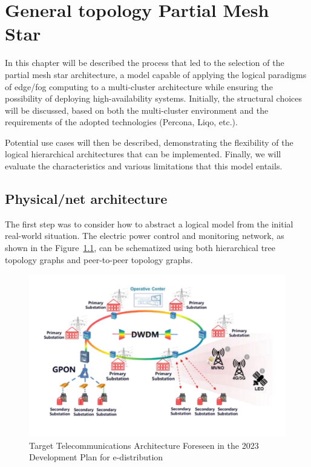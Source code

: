 \chapter{General topology Partial Mesh Star}\label{chap:partial-mesh-star}
In this chapter will be described the process that led to the selection of the partial mesh star architecture, a model capable of applying the logical paradigms of edge/fog computing to a multi-cluster architecture while ensuring the possibility of deploying high-availability systems. Initially, the structural choices will be discussed, based on both the multi-cluster environment and the requirements of the adopted technologies (Percona, Liqo, etc.).

Potential use cases will then be described, demonstrating the flexibility of the logical hierarchical architectures that can be implemented. Finally, we will evaluate the characteristics and various limitations that this model entails.

\section{Physical/net architecture}
The first step was to consider how to abstract a logical model from the initial real-world situation. The electric power control and monitoring network, as shown in the Figure~\ref{fig:real-net}, can be schematized using both hierarchical tree topology graphs and peer-to-peer topology graphs.

\begin{figure}[ht]\centering
\includegraphics[scale=0.6]{Pictures/real-scheme-net}
\caption{Target Telecommunications Architecture Foreseen in the 2023 Development Plan for e-distribution}\label{fig:real-net}
\end{figure}


